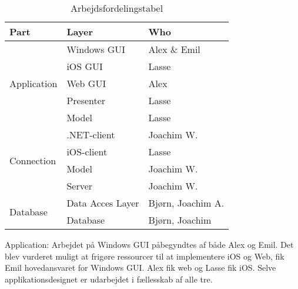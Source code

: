 \begin{table}[]
\centering
\begin{tabular}{|l|l|l|}
\hline
Part                         & Layer            & Who               \\ \hline
\multirow{5}{*}{Application} & Windows GUI      & Alex \& Emil      \\ \cline{2-3} 
                             & iOS GUI          & Lasse             \\ \cline{2-3} 
                             & Web GUI          & Alex              \\ \cline{2-3} 
                             & Presenter        & Lasse             \\ \cline{2-3} 
                             & Model            & Lasse             \\ \hline
\multirow{4}{*}{Connection}  & .NET-client      & Joachim W.        \\ \cline{2-3} 
                             & iOS-client       & Lasse             \\ \cline{2-3} 
                             & Model            & Joachim W.        \\ \cline{2-3} 
                             & Server           & Joachim W.        \\ \hline
\multirow{2}{*}{Database}    & Data Acces Layer & Bjørn, Joachim A. \\ \cline{2-3} 
                             & Database         & Bjørn, Joachim    \\ \hline
\end{tabular}
\caption{Arbejdsfordelingstabel}
\label{table:arbejdsfordelingstabel}
\end{table}

Application: Arbejdet på Windows GUI påbegyndtes af både Alex og Emil. Det blev vurderet muligt at frigøre ressourcer til at implementere iOS og Web, fik Emil hovedansvaret for Windows GUI. Alex fik web og Lasse fik iOS. Selve applikationsdesignet er udarbejdet i fællesskab af alle tre.